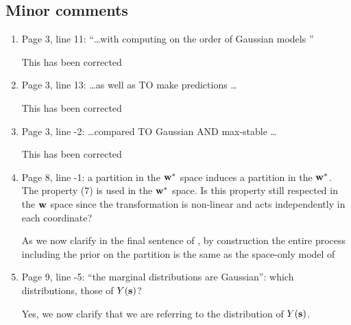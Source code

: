 \documentclass[11pt]{article}
\begin{document}
\subsection*{Minor comments}
\begin{enumerate}[1.]
  \item Page 3, line 11: ``\ldots with computing on the order of Gaussian models ''\\

  \begin{response}
    This has been corrected
  \end{response}

  \item Page 3, line 13: \ldots as well as TO make predictions \ldots \\

  \begin{response}
    This has been corrected
  \end{response}

  \item Page 3, line -2: \ldots compared TO Gaussian AND max-stable \ldots \\

  \begin{response}
    This has been corrected
  \end{response}

  \item Page 8, line -1: a partition in the $\mbox{\bf w}^*$ space induces a partition in the $\mbox{\bf w}^*$. The property (7) is used in the $\mbox{\bf w}^*$ space. Is this property still respected in the $\mbox{\bf w}$ space since the transformation is non-linear and acts independently in each coordinate? \\

  \begin{response}
    As we now clarify in the final sentence of , by construction the entire process including the prior on the partition is the same as the space-only model of 
  \end{response}

  \item Page 9, line -5: ``the marginal distributions are Gaussian'': which distributions, those of $Y(\mbox{\bf s})$? \\

  \begin{response}
    Yes, we now clarify that we are referring to the distribution of $Y(\mbox{\bf s})$.
  \end{response}


\end{enumerate}
\end{document}
